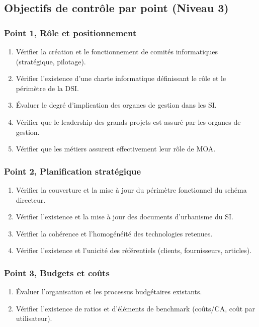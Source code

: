 \subsection{Objectifs de contrôle par point (Niveau 3)}

\subsubsection{Point 1, Rôle et positionnement}
\begin{enumerate}[label=1.\arabic*.]
    \item Vérifier la création et le fonctionnement de comités informatiques (stratégique, pilotage).
    \item Vérifier l'existence d'une charte informatique définissant le rôle et le périmètre de la DSI.
    \item Évaluer le degré d'implication des organes de gestion dans les SI.
    \item Vérifier que le leadership des grands projets est assuré par les organes de gestion.
    \item Vérifier que les métiers assurent effectivement leur rôle de MOA.
\end{enumerate}

\subsubsection{Point 2, Planification stratégique}
\begin{enumerate}[label=2.\arabic*.]
    \item Vérifier la couverture et la mise à jour du périmètre fonctionnel du schéma directeur.
    \item Vérifier l'existence et la mise à jour des documents d'urbanisme du SI.
    \item Vérifier la cohérence et l'homogénéité des technologies retenues.
    \item Vérifier l'existence et l'unicité des référentiels (clients, fournisseurs, articles).
\end{enumerate}

\subsubsection{Point 3, Budgets et coûts}
\begin{enumerate}[label=3.\arabic*.]
    \item Évaluer l'organisation et les processus budgétaires existants.
    \item Vérifier l'existence de ratios et d'éléments de benchmark (coûts/CA, coût par utilisateur).
\end{enumerate}


